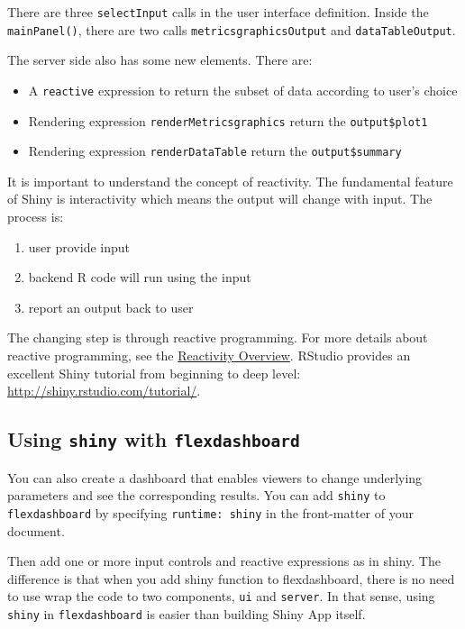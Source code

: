 \documentclass[]{book}
\providecommand{\tightlist}{%
  \setlength{\itemsep}{0pt}\setlength{\parskip}{0pt}}
\theoremstyle{definition}
\theoremstyle{definition}
\theoremstyle{remark}
\begin{document}
There are three \texttt{selectInput} calls in the user interface
definition. Inside the \texttt{mainPanel()}, there are two calls
\texttt{metricsgraphicsOutput} and \texttt{dataTableOutput}.

The server side also has some new elements. There are:

\begin{itemize}
\tightlist
\item
  A \texttt{reactive} expression to return the subset of data according
  to user's choice
\item
  Rendering expression \texttt{renderMetricsgraphics} return the
  \texttt{output\$plot1}
\item
  Rendering expression \texttt{renderDataTable} return the
  \texttt{output\$summary}
\end{itemize}

It is important to understand the concept of reactivity. The fundamental
feature of Shiny is interactivity which means the output will change
with input. The process is:

\begin{enumerate}
\def\labelenumi{\arabic{enumi}.}
\tightlist
\item
  user provide input
\item
  backend R code will run using the input
\item
  report an output back to user
\end{enumerate}

The changing step is through reactive programming. For more details
about reactive programming, see the
\href{http://shiny.rstudio.com/articles/reactivity-overview.html}{Reactivity
Overview}. RStudio provides an excellent Shiny tutorial from beginning
to deep level: \url{http://shiny.rstudio.com/tutorial/}.

\subsection{\texorpdfstring{Using \texttt{shiny} with
\texttt{flexdashboard}}{Using shiny with flexdashboard}}\label{using-shiny-with-flexdashboard}

You can also create a dashboard that enables viewers to change
underlying parameters and see the corresponding results. You can add
\texttt{shiny} to \texttt{flexdashboard} by specifying
\texttt{runtime:\ shiny} in the front-matter of your document.

Then add one or more input controls and reactive expressions as in
shiny. The difference is that when you add shiny function to
flexdashboard, there is no need to use wrap the code to two components,
\texttt{ui} and \texttt{server}. In that sense, using \texttt{shiny} in
\texttt{flexdashboard} is easier than building Shiny App itself.
\end{document}
